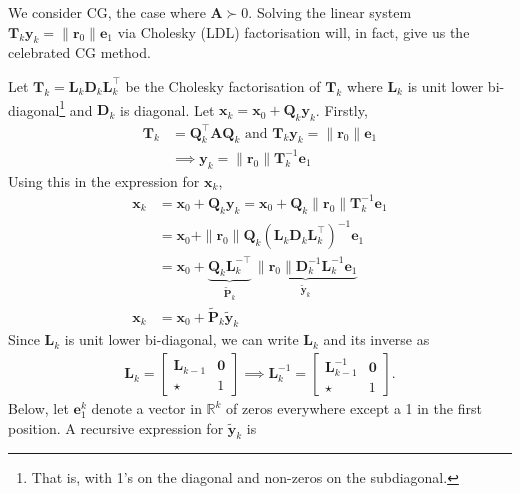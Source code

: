 \documentclass[12pt,a4paper]{article} %
\begin{document}
We consider CG, the case where $\mathbf A \succ 0$.
Solving the linear system 
$\mathbf T_k \bm y_k = \| \bm r_0 \| \bm e_1$ via Cholesky
(LDL) factorisation will, in fact, give us the celebrated CG method.

Let $\mathbf T_k = \mathbf L_k \mathbf D_k \mathbf L_k^\top$ be the Cholesky
factorisation of $\mathbf T_k$ where $\mathbf L_k$ is unit lower bi-diagonal\footnote{That is, with 1's on the diagonal and non-zeros on the subdiagonal.} 
and $\mathbf D_k$ is diagonal. Let $\bm x_k = \bm x_0 + \mathbf Q_k \bm y_k$. Firstly, 
\begin{align*}
    \mathbf T_k &= \mathbf Q_k^\top \mathbf A \mathbf Q_k \text{ and } \mathbf T_k \bm y_k = \| \bm r_0 \| \bm e_1 \\ 
    &\implies \bm y_k = \| \bm r_0 \| \mathbf T_k^{-1}\bm e_1
\end{align*}
Using this in the expression for $\bm x_k$, 
\begin{align*}
    \bm x_k &= \bm x_0 + \mathbf Q_k \bm y_k  = \bm x_0 + \mathbf Q_k\| \bm r_0 \| \mathbf T_k^{-1}\bm e_1 \\ 
    &= \bm x_0 + \| \bm r_0 \| \mathbf Q_k (\mathbf L_k \mathbf D_k \mathbf L_k^\top)^{-1} \bm e_1 \\ 
    &= \bm x_0 +  \underbrace{\mathbf Q_k \mathbf L_k^{-\top} }_{\mathbf {\tilde P}_k}\, \underbrace{\| \bm r_0 \|\mathbf D_k^{-1} \mathbf L_k^{-1} \bm e_1}_{\bm {\tilde y}_k} \\ 
    \bm x_k &= \bm x_0 + \mathbf {\tilde P}_k \bm {\tilde y}_k
\end{align*}
Since $\mathbf L_k$ is unit lower bi-diagonal, we can write $\mathbf L_k$ 
and its inverse as
\begin{align*}
    \mathbf L_k = \begin{bmatrix}
        \mathbf L_{k-1} & \bm 0 \\ 
        \star & 1
    \end{bmatrix}
    \implies \mathbf L_k^{-1} = \begin{bmatrix}
        \mathbf L_{k-1}^{-1} & \bm 0 \\ 
        \star & 1
    \end{bmatrix}.
\end{align*}
Below, let $\bm e_1^k$ denote a vector in $\mathbb R^k$ of zeros everywhere 
except a 1 in the first position.
A recursive expression for $\bm {\tilde y}_k$ is 
\end{document}
